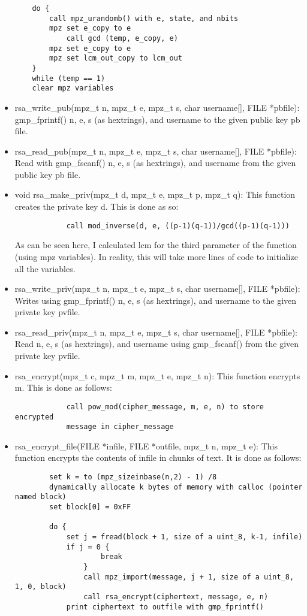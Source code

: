\documentclass[11pt]{article}
\begin{document}
\begin{itemize}
\begin{verbatim}
	do {
		call mpz_urandomb() with e, state, and nbits
		mpz set e_copy to e
        	call gcd (temp, e_copy, e)
		mpz set e_copy to e
		mpz set lcm_out_copy to lcm_out
	}
	while (temp == 1)
	clear mpz variables
    \end{verbatim}
    \item rsa\_write\_pub(mpz\_t n, mpz\_t e, mpz\_t s, char username[], FILE *pbfile): gmp\_fprintf() n, e, s (as hextrings), and username to the given public key
	    pb file.
    \item rsa\_read\_pub(mpz\_t n, mpz\_t e, mpz\_t s, char username[], FILE *pbfile): Read with gmp\_fscanf() n, e, s (as hextrings), and username from the given
	    public key pb file.
    \item void rsa\_make\_priv(mpz\_t d, mpz\_t e, mpz\_t p, mpz\_t q): This function creates the private key d. This is done as so:
    \begin{verbatim}
            call mod_inverse(d, e, ((p-1)(q-1))/gcd((p-1)(q-1)))
    \end{verbatim}
		As can be seen here, I calculated lcm for the third parameter of the function (using mpz variables). In reality, this will take more lines of
		code to initialize all the variables.
	\item rsa\_write\_priv(mpz\_t n, mpz\_t e, mpz\_t s, char username[], FILE *pbfile): Writes using gmp\_fprintf() n, e, s (as hextrings), and username to
		the given private key pvfile.
	\item rsa\_read\_priv(mpz\_t n, mpz\_t e, mpz\_t s, char username[], FILE *pbfile): Read n, e, s (as hextrings), and username using gmp\_fscanf()
		from the given private key pvfile.
    \item rsa\_encrypt(mpz\_t c, mpz\_t m, mpz\_t e, mpz\_t n): This function encrypts m. This is done as follows: 
	    \begin{verbatim}
            call pow_mod(cipher_message, m, e, n) to store encrypted
            message in cipher_message
    \end{verbatim}
    \item rsa\_encrypt\_file(FILE *infile, FILE *outfile, mpz\_t n, mpz\_t e): This function encrypts the contents of infile in chunks of text. It is done as
	    follows: \begin{verbatim}
	    set k = to (mpz_sizeinbase(n,2) - 1) /8
	    dynamically allocate k bytes of memory with calloc (pointer named block)
	    set block[0] = 0xFF

	    do {
		    set j = fread(block + 1, size of a uint_8, k-1, infile)
		    if j = 0 {
	            	break
	            }
	    	    call mpz_import(message, j + 1, size of a uint_8, 1, 0, block)
	            call rsa_encrypt(ciphertext, message, e, n)
		    print ciphertext to outfile with gmp_fprintf()


\end{verbatim}
\end{itemize}
\end{document}

